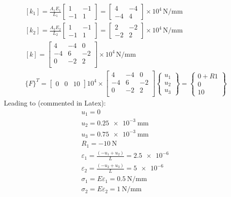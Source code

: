 \begin{gather}
	\left[k_1\right] = \frac{A_1E_1}{L_1} \begin{bmatrix}
		1 & -1\\
		-1 & 1
	\end{bmatrix} = \begin{bmatrix}
		4 & -4\\
		-4 & 4
	\end{bmatrix}\times 10^4\, \si{\newton\per\milli\meter}\\
	\left[k_2\right] = \frac{A_2E_2}{L_2} \begin{bmatrix}
		1 & -1\\
		-1 & 1
	\end{bmatrix} = \begin{bmatrix}
		2 & -2\\
		-2 & 2
	\end{bmatrix}\times 10^4\, \si{\newton\per\milli\meter}\\
	\left[k\right] = \begin{bmatrix}
		4 & -4 & 0\\
		-4 & 6 & -2\\
		0 & -2 & 2\\
	\end{bmatrix}\times 10^4\, \si{\newton\per\milli\meter}\\
	\{F\}^T = \begin{bmatrix}
		0 & 0 & 10
	\end{bmatrix}
	10^4\times\begin{bmatrix}
		4 & -4 & 0\\
		-4 & 6 & -2\\
		0 & -2 & 2\\
	\end{bmatrix}\begin{Bmatrix}
		u_1\\
		u_2\\
		u_3
	\end{Bmatrix} = \begin{Bmatrix}
		0 + R1\\
		0\\
		10
	\end{Bmatrix}
\end{gather}
Leading to (commented in Latex):
\begin{gather}
	u_1 = 0\\
	u_2 = \SI{0.25e-3}{\milli\meter}\\
	u_3 = \SI{0.75e-3}{\milli\meter}\\
	R_1 = \SI{-10}{\newton}\\
	\varepsilon_1 = \frac{\left(-u_1+u_2\right)}{L} = \SI{2.5e-6}{}\\
	\varepsilon_2 = \frac{\left(-u_2+u_3\right)}{L} = \SI{5e-6}{}\\
	\sigma_1 = E\varepsilon_1 = \SI{0.5}{\newton\per\milli\meter}\\
	\sigma_2 = E\varepsilon_2 = \SI{1}{\newton\per\milli\meter}
\end{gather}
